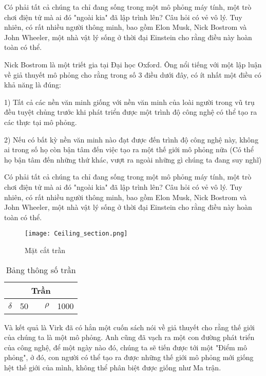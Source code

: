 Có phải tất cả chúng ta chỉ đang sống trong một mô phỏng máy tính, một trò chơi điện tử mà ai đó "ngoài kia" đã lập trình lên? Câu hỏi có vẻ vô lý. Tuy nhiên, có rất nhiều người thông minh, bao gồm Elon Musk, Nick Bostrom và John Wheeler, một nhà vật lý sống ở thời đại Einstein cho rằng điều này hoàn toàn có thể.

Nick Bostrom là một triết gia tại Đại học Oxford. Ông nổi tiếng với một lập luận về giả thuyết mô phỏng cho rằng trong số 3 điều dưới đây, có ít nhất một điều có khả năng là đúng:

1) Tất cả các nền văn minh giống với nền văn minh của loài người trong vũ trụ đều tuyệt chủng trước khi phát triển được một trình độ công nghệ có thể tạo ra các thực tại mô phỏng.

2) Nếu có bất kỳ nền văn minh nào đạt được đến trình độ công nghệ này, không ai trong số họ còn bận tâm đến việc tạo ra một thế giới mô phỏng nữa (Có thể họ bận tâm đến những thứ khác, vượt ra ngoài những gì chúng ta đang suy nghĩ)

Có phải tất cả chúng ta chỉ đang sống trong một mô phỏng máy tính, một trò chơi điện tử mà ai đó "ngoài kia" đã lập trình lên? Câu hỏi có vẻ vô lý. Tuy nhiên, có rất nhiều người thông minh, bao gồm Elon Musk, Nick Bostrom và John Wheeler, một nhà vật lý sống ở thời đại Einstein cho rằng điều này hoàn toàn có thể.


\begin{figure}[H]
	\centering
	\texttt{[image: Ceiling\_section.png]}
	\caption{Mặt cắt trần}
	\label{H:tstran}	
\end{figure}

\begin{wraptable}{l}{0.35\textwidth}
		\centering
		\begin{tabular}{|r|r|r|r|r|}
			\toprule
			\multicolumn{5}{|c|}{\textbf{Trần }} \\
			\midrule
			{\LARGE $\delta$}& 50    &       &{\LARGE $\rho$}& 1000 \\
			\bottomrule
		\end{tabular}%
		\label{B:tstran}%
		\caption{Bảng thông số trần}
\end{wraptable}

Và kết quả là Virk đã có hẳn một cuốn sách nói về giả thuyết cho rằng thế giới của chúng ta là một mô phỏng. Anh cũng đã vạch ra một con đường phát triển của công nghệ, để một ngày nào đó, chúng\autocite{einstein} ta sẽ tiến được tới một "Điểm mô phỏng", ở đó, con người có thể tạo ra được những thế giới mô phỏng mới giống hệt thế giới của mình, không thể phân biệt được giống như Ma trận.

